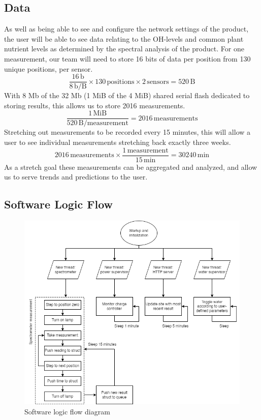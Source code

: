 \documentclass[journal]{IEEEtran}
\begin{document}
\subsection{Data} As well as being able to see and configure the network settings of the product, the user will be able to see data relating to the OH-levels and common plant nutrient levels as determined by the spectral analysis of the product. For one measurement, our team will need to store 16 bits of data per position from 130 unique positions, per sensor.
\begin{equation}
	\frac{16\,\mathrm{b}}{8\,\mathrm{b/B}}\times 130\,\mathrm{positions} \times 2\,\mathrm{sensors} = 520\,\mathrm{B}
\end{equation}
With 8 Mb of the 32 Mb (1 MiB of the 4 MiB) shared serial flash dedicated to storing results, this allows us to store 2016 measurements.
\begin{equation}
	\frac{1\,\mathrm{MiB}}{520\,\mathrm{B/measurement}} = 2016\,\mathrm{measurements}
\end{equation}
Stretching out measurements to be recorded every 15 minutes, this will allow a user to see individual measurements stretching back exactly three weeks.
\begin{equation}
	2016\,\mathrm{measurements} \times \frac{1\,\mathrm{measurement}}{15\,\mathrm{min}} = 30240\,\mathrm{min}
\end{equation}
As a stretch goal these measurements can be aggregated and analyzed, and allow us to serve trends and predictions to the user.

\subsection{Software Logic Flow} 
\begin{figure}[H]
    \centering
    \label{fig:logic-flow}
    \includegraphics[width=\linewidth]{images/logic-flow.png}
    \caption{Software logic flow diagram}
\end{figure}
\end{document}
